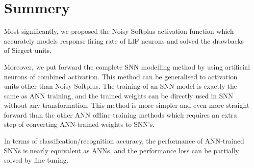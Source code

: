 \section{Summery}
	Most significantly, we proposed the Noisy Softplus activation function which accurately models response firing rate of LIF neurons and solved the drawbacks of Siegert units.
%		
%		
%		
%		

	Moreover, we put forward the complete SNN modelling method by using artificial neurons of combined activation.
	This method can be generalised to activation units other than Noisy Softplus.
	The training of an SNN model is exactly the same as ANN training, and the trained weights can be directly used in SNN without any transformation.
	This method is more simpler and even more straight forward than the other ANN offline training methods which requires an extra step of converting ANN-trained weights to SNN's.
	
	In terms of classification/recognition accuracy, the performance of ANN-trained SNNs is nearly equivalent as ANNs, and the performance loss can  be partially solved by fine tuning.
	


